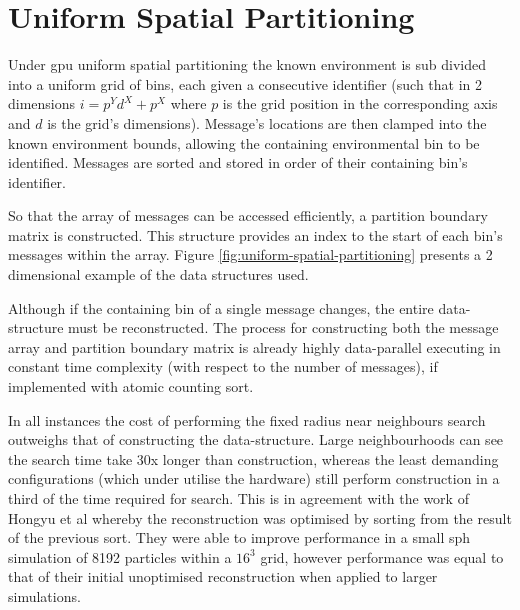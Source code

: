 \section{Uniform Spatial Partitioning\label{sec:spatial-partitioning}}

Under \gls{gpu} uniform spatial partitioning the known environment is sub divided into a uniform grid of bins, each given a consecutive identifier (such that in 2 dimensions $i = p^{Y}d^{X}+p^{X}$ where $p$ is the grid position in the corresponding axis and $d$ is the grid's dimensions). Message's locations are then clamped into the known environment bounds, allowing the containing environmental bin to be identified. Messages are sorted and stored in order of their containing bin's identifier.

So that the array of messages can be accessed efficiently, a partition boundary matrix is constructed. This structure provides an index to the start of each bin's messages within the array. Figure \ref{fig:uniform-spatial-partitioning} presents a 2 dimensional example of the data structures used.

Although if the containing bin of a single message changes, the entire data-structure must be reconstructed. The process for constructing both the message array and partition boundary matrix is already highly data-parallel executing in constant time complexity (with respect to the number of messages), if implemented with atomic counting sort.

In all instances the cost of performing the fixed radius near neighbours search outweighs that of constructing the data-structure. Large neighbourhoods can see the search time take 30x longer than construction, whereas the least demanding configurations (which under utilise the hardware) still perform construction in a third of the time required for search. This is in agreement with the work of Hongyu et al whereby the reconstruction was optimised by sorting from the result of the previous sort\cite{HY*15}. They were able to improve performance in a small \gls{sph} simulation of 8192 particles within a $16^{3}$ grid, however performance was equal to that of their initial unoptimised reconstruction when applied to larger simulations.

